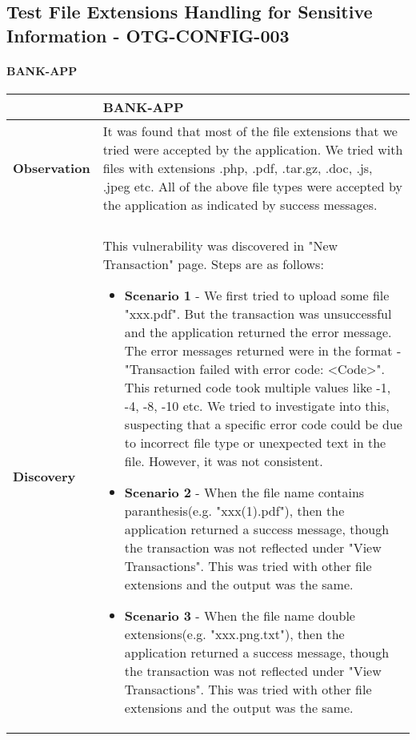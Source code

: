\subsection{Test File Extensions Handling for Sensitive Information - OTG-CONFIG-003} \label{OTG-CONFIG-003}
\paragraph{BANK-APP} \mbox{}
\begin{longtable*}{p{.20\textwidth} | p{.80\textwidth}}
    \hline
    & \textbf{BANK-APP} \\
    \hline
    \textbf{Observation} &
      It was found that most of the file extensions that we tried were accepted by the application. We tried with files with extensions .php, .pdf, .tar.gz, .doc, .js, .jpeg etc. All of the above file types were accepted by the application as indicated by success messages.
    \\\\
    \textbf{Discovery} &
        This vulnerability was discovered in "New Transaction" page. Steps are as follows:
        \begin{itemize}
         \item \textbf{Scenario 1} - We first tried to upload some file "xxx.pdf". But the transaction was unsuccessful and the application returned the error message. 
         The error messages returned were in the format - "Transaction failed with error code: <Code>". This returned code took multiple values like -1, -4, -8, -10 etc. We tried to investigate into this, suspecting that a specific error code could be due to incorrect file type or unexpected text in the file. However, it was not consistent. 

         \item \textbf{Scenario 2} - When the file name contains paranthesis(e.g. "xxx(1).pdf"), then the application returned a success message, though the transaction was not reflected under "View Transactions". This was tried with other file extensions and the output was the same.

         \item \textbf{Scenario 3} - When the file name double extensions(e.g. "xxx.png.txt"), then the application returned a success message, though the transaction was not reflected under "View Transactions". This was tried with other file extensions and the output was the same.
        \end{itemize}


\end{longtable*}
